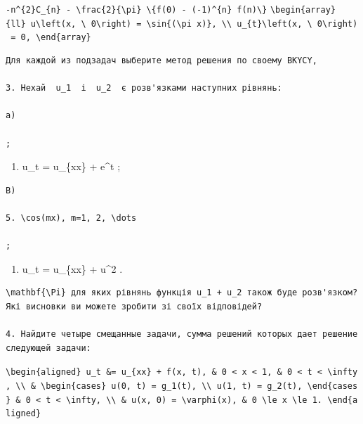 \documentclass[
  ukrainian,
]{article}
\providecommand{\tightlist}{%
  \setlength{\itemsep}{0pt}\setlength{\parskip}{0pt}}
\begin{document}
\texttt{-n\^{}\{2\}C\_\{n\}\ -\ \textbackslash{}frac\{2\}\{\textbackslash{}pi\}\ \textbackslash{}\{f\textquotesingle{}(0)\ -\ (-1)\^{}\{n\}\ f\textquotesingle{}(n)\textbackslash{}\}}
\texttt{\textbackslash{}begin\{array\}\{ll\}\ u\textbackslash{}left(x,\ \textbackslash{}\ 0\textbackslash{}right)\ =\ \textbackslash{}sin\{(\textbackslash{}pi\ x)\},\ \textbackslash{}\textbackslash{}\ u\_\{t\}\textbackslash{}left(x,\ \textbackslash{}\ 0\textbackslash{}right)\ =\ 0,\ \textbackslash{}end\{array\}}

\begin{verbatim}
Для каждой из подзадач выберите метод решения по своему BKYCY,

3. Нехай  u_1  і  u_2  є розв'язками наступних рівнянь:

a)

;
\end{verbatim}

\begin{enumerate}
\def\labelenumi{\alph{enumi})}
\setcounter{enumi}{1}
\tightlist
\item
  u\_t = u\_\{xx\} + e\^{}t ;
\end{enumerate}

\begin{verbatim}
B)

5. \cos(mx), m=1, 2, \dots 

;
\end{verbatim}

\begin{enumerate}
\def\labelenumi{\Alph{enumi})}
\setcounter{enumi}{5}
\tightlist
\item
  u\_t = u\_\{xx\} + u\^{}2 .
\end{enumerate}

\begin{verbatim}
\mathbf{\Pi} для яких рівнянь функція u_1 + u_2 також буде розв'язком? Які висновки ви можете зробити зі своїх відповідей?

4. Найдите четыре смещанные задачи, сумма решений которых дает решение следующей задачи:
\end{verbatim}

\texttt{\textbackslash{}begin\{aligned\}\ u\_t\ \&=\ u\_\{xx\}\ +\ f(x,\ t),\ \&\ 0\ \textless{}\ x\ \textless{}\ 1,\ \&\ 0\ \textless{}\ t\ \textless{}\ \textbackslash{}infty,\ \textbackslash{}\textbackslash{}\ \&\ \textbackslash{}begin\{cases\}\ u(0,\ t)\ =\ g\_1(t),\ \textbackslash{}\textbackslash{}\ u(1,\ t)\ =\ g\_2(t),\ \textbackslash{}end\{cases\}\ \&\ 0\ \textless{}\ t\ \textless{}\ \textbackslash{}infty,\ \textbackslash{}\textbackslash{}\ \&\ u(x,\ 0)\ =\ \textbackslash{}varphi(x),\ \&\ 0\ \textbackslash{}le\ x\ \textbackslash{}le\ 1.\ \textbackslash{}end\{aligned\}}
\end{document}
